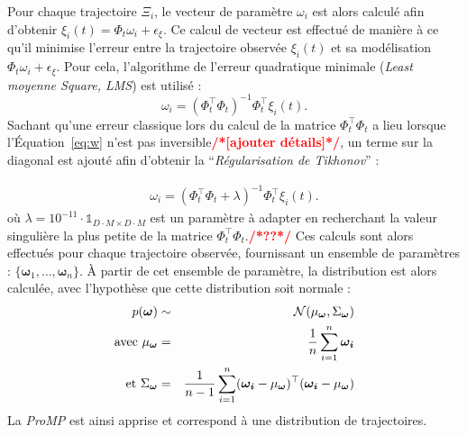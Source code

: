 \documentclass[utf8]{frontiersSCNS} %
\newcommand{\todo}[1]{\textcolor{red}{\textbf{/*#1*/}}}
\begin{document}
Pour chaque trajectoire $\Xi_i$, le vecteur de paramètre $\omega_i$ est alors calculé afin d'obtenir $\xi_i(t) = \Phi_t \omega_i + \epsilon_\xi$. Ce calcul de vecteur est effectué de manière à ce qu'il minimise l'erreur entre la trajectoire observée $\xi_i(t)$ et sa modélisation $\Phi_t \omega_i + \epsilon_\xi$. Pour cela, l'algorithme de l'erreur quadratique minimale (\textit{Least moyenne Square, LMS}) est utilisé :
\begin{equation} \label{eq:w}
\omega_i = (\Phi_t^\top\Phi_t)^{-1}\Phi_t^\top \xi_i(t).
\end{equation} 
Sachant qu'une erreur classique lors du calcul de la matrice $\Phi_t^\top\Phi_t$ a lieu lorsque l'Équation~\ref{eq:w} n'est pas inversible\todo{[ajouter détails]}, un terme sur la diagonal est ajouté afin d'obtenir la ``\textit{Régularisation de Tikhonov}'' :

\begin{eqnarray} \label{eq:wInvertible}
\omega_i = (\Phi_t^\top\Phi_t + \lambda)^{-1}\Phi_t^\top \xi_i(t).
\end{eqnarray} 
où $\lambda=10^{-11} \cdot \mathds{1}_{ D\cdot M \times D\cdot M} $ est un paramètre à adapter en recherchant la valeur singulière la plus petite de la matrice $\Phi_t^\top\Phi_t$.\todo{??}
Ces calculs sont alors effectués pour chaque trajectoire observée, fournissant un ensemble de paramètres : $\{\boldsymbol{\omega}_1,\ldots, \boldsymbol{\omega}_n\}$. À partir de cet ensemble de paramètre, la distribution est alors calculée, avec l'hypothèse que cette distribution soit normale :
\begin{eqnarray}
p(\boldsymbol{\omega}) & \sim & \mathcal{N}(\mu_{\boldsymbol{\omega}}, \Sigma_{\boldsymbol{\omega}})\\
\mathrm{avec }~\mu_{\boldsymbol{\omega}} & = & {1 \over n} \sum_{i=1}^n \boldsymbol{\omega_i} \\
\mathrm{et }~\Sigma_{\boldsymbol{\omega}} & = & {1 \over n-1} \sum_{i=1}^n (\boldsymbol{\omega_i} - \mu_{\boldsymbol{\omega}})^\top (\boldsymbol{\omega_i} - \mu_{\boldsymbol{\omega}})
\end{eqnarray}
La \textit{ProMP} est ainsi apprise et correspond à une distribution de trajectoires. 
\end{document}
